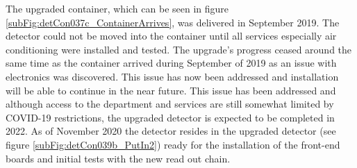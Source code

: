 The upgraded container, which can be seen in figure \ref{subFig:detCon037c_ContainerArrives}, was delivered in September 2019. The detector could not be moved into the container until all services especially air conditioning were installed and tested. The upgrade's progress ceased around the same time as the container arrived during September of 2019 as an issue with electronics was discovered. This issue has now been addressed and installation will be able to continue in the near future. This issue has been addressed and although access to the department and services are still somewhat limited by COVID-19 restrictions, the upgraded detector is expected to be completed in 2022. As of November 2020 the detector resides in the upgraded detector (see figure \ref{subFig:detCon039b_PutIn2}) ready for the installation of the front-end boards and initial tests with the new read out chain.


